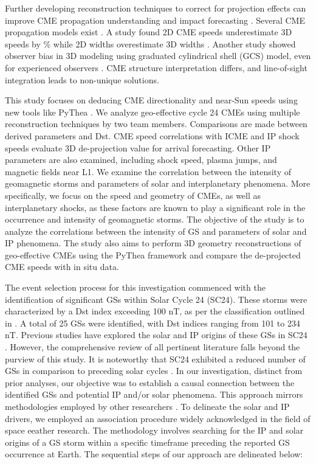 Further developing reconstruction techniques to correct for projection effects can improve CME propagation understanding and impact forecasting \citep{thernisien_2009, mierla_2010, wood_2010, thernisien_2011}. Several CME propagation models exist \citep{odstrcil_2004, xie_2004, vrvsnak_2013, pomoell_2018}. A study found 2D CME speeds underestimate 3D speeds by \% while 2D widths overestimate 3D widths \citep{jang_2016}. Another study showed observer bias in 3D modeling using graduated cylindrical shell (GCS) model, even for experienced observers \citep{verbeke_2022}. CME structure interpretation differs, and line-of-sight integration leads to non-unique solutions.

This study focuses on deducing CME directionality and near-Sun speeds using new tools like PyThea \citep{kouloumvakos_2022}. We analyze geo-effective cycle 24 CMEs using multiple reconstruction techniques by two team members. Comparisons are made between derived parameters and Dst. CME speed correlations with ICME and IP shock speeds evaluate 3D de-projection value for arrival forecasting. Other IP parameters are also examined, including shock speed, plasma jumps, and magnetic fields near L1. We examine the correlation between the intensity of geomagnetic storms and parameters of solar and interplanetary phenomena. More specifically, we focus on the speed and geometry of CMEs, as well as interplanetary shocks, as these factors are known to play a significant role in the occurrence and intensity of geomagnetic storms. The objective of the study is to analyze the correlations between the intensity of GS and parameters of solar and IP phenomena. The study also aims to perform 3D geometry reconstructions of geo-effective CMEs using the PyThea framework and compare the de-projected CME speeds with in situ data.

The event selection process for this investigation commenced with the identification of significant GSs within Solar Cycle 24 (SC24). These storms were characterized by a Dst index exceeding 100 nT, as per the classification outlined in \citet{gonzalez_1994}. A total of 25 GSs were identified, with Dst indices ranging from 101 to 234 nT. Previous studies have explored the solar and IP origins of these GSs in SC24 \citep{gopalswamy_gs_2022, qiu_2022, besliu_2022, abe_2023}. However, the comprehensive review of all pertinent literature falls beyond the purview of this study. It is noteworthy that SC24 exhibited a reduced number of GSs in comparison to preceding solar cycles \citep{selvakumaran_2016}.
In our investigation, distinct from prior analyses, our objective was to establish a causal connection between the identified GSs and potential IP and/or solar phenomena. This approach mirrors methodologies employed by other researchers \citep{zhang_2007, gonzalez_2007, gopalswamy_2008, echer_2013, manu_2022}. To delineate the solar and IP drivers, we employed an association procedure widely acknowledged in the field of space eeather research. The methodology involves searching for the IP and solar origins of a GS storm within a specific timeframe preceding the reported GS occurrence at Earth. The sequential steps of our approach are delineated below:

